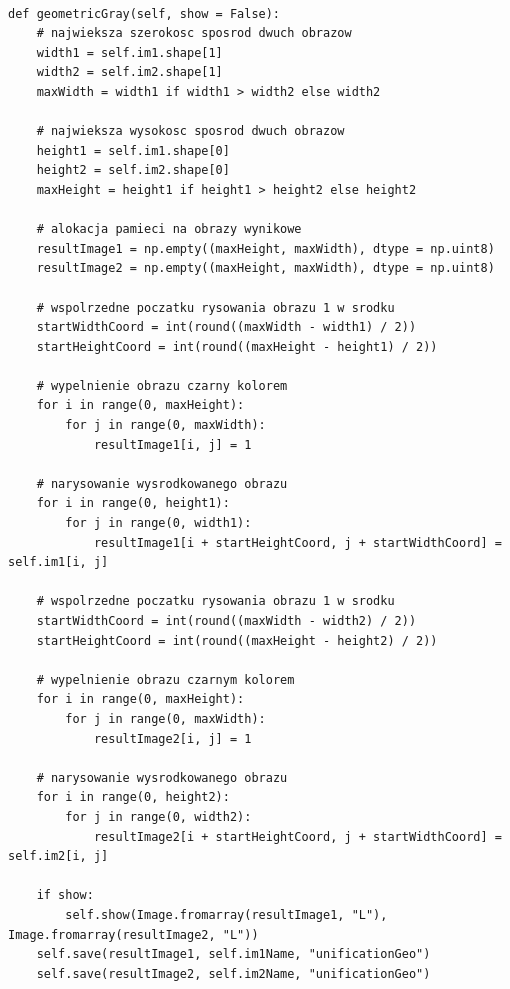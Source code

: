 \documentclass[final,a4paper,openany,12pt]{mwbk}
\begin{document}

\begin{lstlisting}[caption=Geometryczne ujednolicanie obrazów szarych]

def geometricGray(self, show = False):
	# najwieksza szerokosc sposrod dwuch obrazow
	width1 = self.im1.shape[1]
	width2 = self.im2.shape[1]
	maxWidth = width1 if width1 > width2 else width2

	# najwieksza wysokosc sposrod dwuch obrazow
	height1 = self.im1.shape[0]
	height2 = self.im2.shape[0]
	maxHeight = height1 if height1 > height2 else height2

	# alokacja pamieci na obrazy wynikowe
	resultImage1 = np.empty((maxHeight, maxWidth), dtype = np.uint8)
	resultImage2 = np.empty((maxHeight, maxWidth), dtype = np.uint8)

	# wspolrzedne poczatku rysowania obrazu 1 w srodku
	startWidthCoord = int(round((maxWidth - width1) / 2))
	startHeightCoord = int(round((maxHeight - height1) / 2))

	# wypelnienie obrazu czarny kolorem
	for i in range(0, maxHeight):
		for j in range(0, maxWidth):
			resultImage1[i, j] = 1

	# narysowanie wysrodkowanego obrazu
	for i in range(0, height1):
		for j in range(0, width1):
			resultImage1[i + startHeightCoord, j + startWidthCoord] = self.im1[i, j]

	# wspolrzedne poczatku rysowania obrazu 1 w srodku
	startWidthCoord = int(round((maxWidth - width2) / 2))
	startHeightCoord = int(round((maxHeight - height2) / 2))

	# wypelnienie obrazu czarnym kolorem
	for i in range(0, maxHeight):
		for j in range(0, maxWidth):
			resultImage2[i, j] = 1

	# narysowanie wysrodkowanego obrazu
	for i in range(0, height2):
		for j in range(0, width2):
			resultImage2[i + startHeightCoord, j + startWidthCoord] = self.im2[i, j]

	if show:
		self.show(Image.fromarray(resultImage1, "L"), Image.fromarray(resultImage2, "L"))
	self.save(resultImage1, self.im1Name, "unificationGeo")
	self.save(resultImage2, self.im2Name, "unificationGeo")

\end{lstlisting}


\newpage
\end{document}
